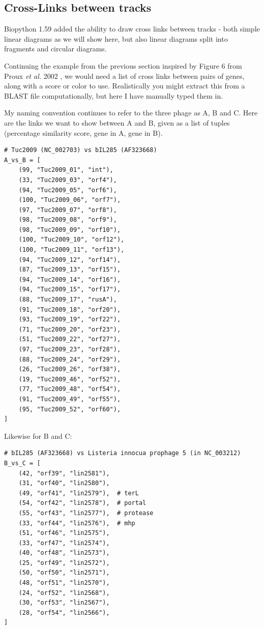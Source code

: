 \subsection{Cross-Links between tracks}
\label{sec:gd_cross_links}

Biopython 1.59 added the ability to draw cross links between tracks - both
simple linear diagrams as we will show here, but also linear diagrams split
into fragments and circular diagrams.

Continuing the example from the previous section inspired by Figure 6 from
Proux \textit{et al.} 2002 \cite{proux2002},
we would need a list of cross links between pairs of genes, along with a score
or color to use. Realistically you might extract this from a BLAST file
computationally, but here I have manually typed them in.

My naming convention continues to refer to the three phage as A, B and C.
Here are the links we want to show between A and B, given as a list of
tuples (percentage similarity score, gene in A, gene in B).

\begin{verbatim}
# Tuc2009 (NC_002703) vs bIL285 (AF323668)
A_vs_B = [
    (99, "Tuc2009_01", "int"),
    (33, "Tuc2009_03", "orf4"),
    (94, "Tuc2009_05", "orf6"),
    (100, "Tuc2009_06", "orf7"),
    (97, "Tuc2009_07", "orf8"),
    (98, "Tuc2009_08", "orf9"),
    (98, "Tuc2009_09", "orf10"),
    (100, "Tuc2009_10", "orf12"),
    (100, "Tuc2009_11", "orf13"),
    (94, "Tuc2009_12", "orf14"),
    (87, "Tuc2009_13", "orf15"),
    (94, "Tuc2009_14", "orf16"),
    (94, "Tuc2009_15", "orf17"),
    (88, "Tuc2009_17", "rusA"),
    (91, "Tuc2009_18", "orf20"),
    (93, "Tuc2009_19", "orf22"),
    (71, "Tuc2009_20", "orf23"),
    (51, "Tuc2009_22", "orf27"),
    (97, "Tuc2009_23", "orf28"),
    (88, "Tuc2009_24", "orf29"),
    (26, "Tuc2009_26", "orf38"),
    (19, "Tuc2009_46", "orf52"),
    (77, "Tuc2009_48", "orf54"),
    (91, "Tuc2009_49", "orf55"),
    (95, "Tuc2009_52", "orf60"),
]
\end{verbatim}

Likewise for B and C:

\begin{verbatim}
# bIL285 (AF323668) vs Listeria innocua prophage 5 (in NC_003212)
B_vs_C = [
    (42, "orf39", "lin2581"),
    (31, "orf40", "lin2580"),
    (49, "orf41", "lin2579"),  # terL
    (54, "orf42", "lin2578"),  # portal
    (55, "orf43", "lin2577"),  # protease
    (33, "orf44", "lin2576"),  # mhp
    (51, "orf46", "lin2575"),
    (33, "orf47", "lin2574"),
    (40, "orf48", "lin2573"),
    (25, "orf49", "lin2572"),
    (50, "orf50", "lin2571"),
    (48, "orf51", "lin2570"),
    (24, "orf52", "lin2568"),
    (30, "orf53", "lin2567"),
    (28, "orf54", "lin2566"),
]
\end{verbatim}

